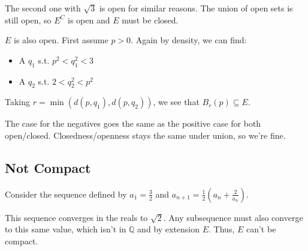 \documentclass[12pt]{article}
\newcommand{\Q}{\mathbb{Q}}
\begin{document}
The second one with $\sqrt{3}$ is open for similar reasons.
The union of open sets is still open, so $E^C$ is open and $E$ must be closed.

$E$ is also open.
First assume $p > 0$.
Again by density, we can find:
\begin{itemize}[nolistsep]
  \item A $q_1$ s.t. $p^2 < q_1^2 < 3$
  \item A $q_2$ s.t. $2 < q_2^2 < p^2$
\end{itemize}
Taking $r=\min(d(p, q_1), d(p, q_2))$, we see that $B_r(p) \subseteq E$.

The case for the negatives goes the same as the positive case for both open/closed.
Closedness/openness stays the same under union, so we're fine.

\subsection{Not Compact}

Consider the sequence defined by $a_1=\frac{3}{2}$ and $a_{n+1}=\frac{1}{2}\left(a_n+\frac{2}{a_n}\right)$.

This sequence converges in the reals to $\sqrt{2}$.
Any subsequence must also converge to this same value, which isn't in $\Q$ and by extension $E$.
Thus, $E$ can't be compact.
\end{document}

